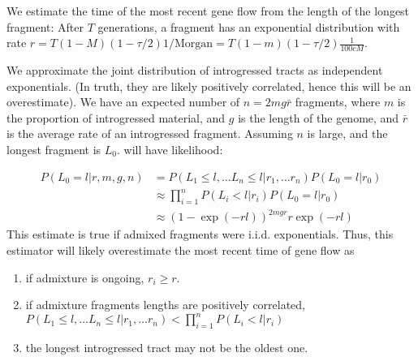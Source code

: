 \documentclass[10pt,a4paper]{article}
\begin{document}
We estimate the time of the most recent gene flow from the length of the longest fragment:
After $T$ generations, a fragment has an exponential distribution with rate $r=T(1-M)(1-\tau/2) 1/\text{Morgan} = T(1-m) (1-\tau/2)\frac{1}{100 cM}$.

We approximate the joint distribution of introgressed tracts as independent exponentials. (In truth, they are likely positively correlated, hence this will be an overestimate). We have an expected number of $n=2mg\bar{r}$ fragments, where $m$ is the proportion of introgressed material, and $g$ is the length of the genome, and $\bar{r}$ is the average rate of an introgressed fragment. Assuming $n$ is large, and the longest fragment is $L_0$. will have likelihood:  

\begin{align}
P(L_0=l | r, m, g, n) 
&= P(L_1 \leq l, \dots L_n \leq l | r_1, \dots r_n) P(L_0 = l | r_0)\nonumber\\
&\approx \prod_{i=1}^n P(L_i < l| r_i) P(L_0 = l | r_0)\nonumber\\
&\approx (1- \exp( -r l ))^{2m g r} r \exp ( -r l)
\end{align}
This estimate is true if admixed fragments were i.i.d. exponentials. Thus, this estimator will likely overestimate the most recent time of gene flow as
\begin{enumerate}
	\item if admixture is ongoing, $r_i \geq r$.
	\item if admixture fragments lengths are positively correlated, $P(L_1 \leq l, \dots L_n \leq l | r_1, \dots r_n) < \prod_{i=1}^n P(L_i < l| r_i)$
	\item the longest introgressed tract may not be the oldest one.
\end{enumerate}
\end{document}
